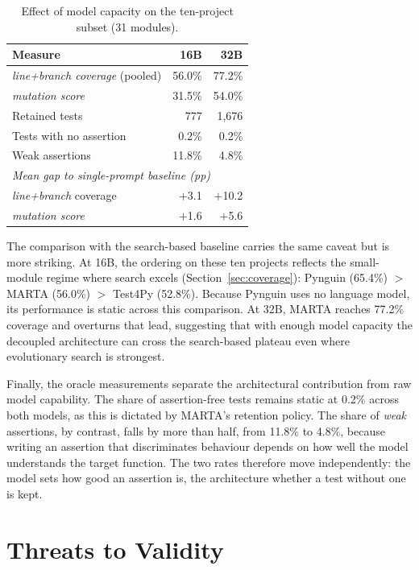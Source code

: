 \documentclass{llncs}
\begin{document}
\begin{table}[htbp]
\centering
\caption{Effect of model capacity on the ten-project subset (31 modules).}
\label{tab:capacity}
\begin{tabular}{lrr}
\toprule
Measure & 16B & 32B \\
\midrule
\emph{line+branch coverage} (pooled) & 56.0\% & 77.2\% \\
\emph{mutation score}                & 31.5\% & 54.0\% \\
Retained tests                & 777    & 1{,}676 \\
Tests with no assertion       & 0.2\%  & 0.2\% \\
Weak assertions               & 11.8\% & 4.8\% \\
\midrule
\multicolumn{3}{l}{\textit{Mean gap to single-prompt baseline (pp)}} \\
\quad \emph{line+branch} coverage    & $+$3.1 & $+$10.2 \\
\quad \emph{mutation score}          & $+$1.6 & $+$5.6 \\
\bottomrule
\end{tabular}
\end{table}

The comparison with the search-based baseline carries the same caveat but is more
striking. At 16B, the ordering on these ten projects reflects the
small-module regime where search excels (Section~\ref{sec:coverage}): Pynguin
(65.4\%) $>$ MARTA (56.0\%) $>$ Test4Py (52.8\%). Because Pynguin uses no language
model, its performance is static across this comparison. At 32B, MARTA reaches 77.2\%
coverage and overturns that lead, suggesting that with enough model capacity the
decoupled architecture can cross the search-based plateau even where evolutionary
search is strongest.



Finally, the oracle measurements separate the architectural contribution from raw
model capability. The share of assertion-free tests remains static at 0.2\% across
both models, as this is dictated by MARTA's retention policy.
The share of \textit{weak} assertions, by contrast, falls by more than half, from
11.8\% to 4.8\%, because writing an assertion that discriminates behaviour depends on
how well the model understands the target function. The two rates therefore move
independently: the model sets how good an assertion is, the architecture whether a
test without one is kept.


\section{Threats to Validity}
\label{sec:val}
\end{document}
